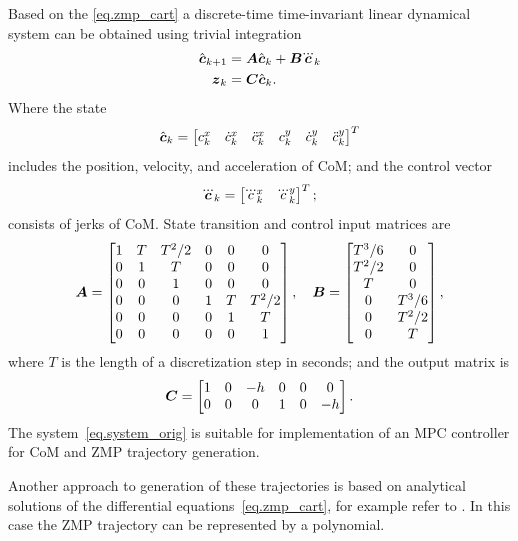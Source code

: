 Based on the \cref{eq.zmp_cart} a discrete-time time-invariant linear dynamical 
system can be obtained using trivial integration
\begin{equation}\label{eq.system_orig}
\begin{split}
\hat{\mbm{c}}_{k+1} &= \mbm{A}\hat{\mbm{c}}_{k}+\mbm{B}\dddot{\mbm{c}}_{k}\\
\mbm{z}_k &= \mbm{C} \hat{\mbm{c}}_{k}.
\end{split}
\end{equation}
Where the state
$$
\hat{\mbox{\boldmath $c$}}_{k} = 
\begin{bmatrix} 
c_k^x & \dot{c}_k^x & \ddot{c}_k^x & c_k^y & \dot{c}_k^y & \ddot{c}_k^y
\end{bmatrix}^T
$$
includes the position, velocity, and acceleration of \ac{CoM}; and the control
vector
$$
\dddot{\mbm{c}}_{k} = \begin{bmatrix} \dddot{c}_k^x & \dddot{c}_k^y \end{bmatrix}^T;
$$
consists of jerks of \ac{CoM}.
State transition and control input matrices are
$$
\mbox{\boldmath $A$} = 
\begin{bmatrix}
    1 & T & T^{2}/2 & 0 & 0 & 0\\ 
    0 & 1 & T & 0 & 0 & 0\\ 
    0 & 0 & 1 & 0 & 0 & 0\\
    0 & 0 & 0 & 1 & T & T^{2}/2\\
    0 & 0 & 0 & 0 & 1 & T\\
    0 & 0 & 0 & 0 & 0 & 1
\end{bmatrix}, \quad
\mbox{\boldmath $B$} =
\begin{bmatrix}
    T^{3}/6 & 0\\ 
    T^{2}/2 & 0\\
    T      & 0\\
    0      & T^{3}/6\\
    0      & T^{2}/2\\
    0      & T
\end{bmatrix},
$$
where $T$ is the length of a discretization step in seconds; and the output matrix is
$$
\mbox{\boldmath $C$} = 
\begin{bmatrix}
    1 & 0 & -h & 0 & 0 & 0\\ 
    0 & 0 & 0  & 1 & 0 & -h\\
\end{bmatrix}.
$$
The system~\eqref{eq.system_orig} is suitable for implementation of an \ac{MPC} 
controller for \ac{CoM} and \ac{ZMP} trajectory generation. 

Another approach to generation of these trajectories is based on analytical 
solutions of the differential equations~\eqref{eq.zmp_cart}, for example refer to 
\cite{MorisawaAnalytical,LiuAnalytical}. In this case the \ac{ZMP} trajectory 
can be represented by a polynomial. 


